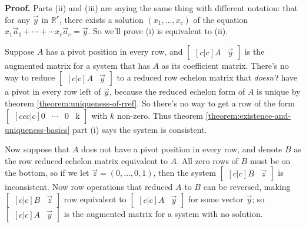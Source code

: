 \documentclass[11pt, letterpaper]{report}
\newenvironment{notes}{}{}
\newenvironment{book}{}{}
\newcounter{theorem}[chapter]
\newcommand{\R}{\mathbb{R}}
\begin{document}
\begin{notes}
\vfill
\newpage
\end{notes}

\begin{book}
\textbf{Proof.} Parts (ii) and (iii) are saying the same thing with different notation: that for any $\vec{y}$ in $\R^r$, there exists a solution $( x_1,\ldots,x_c )$ of the equation $x_1\vec{a}_1 + \cdots + \cdots x_c\vec{a}_c = \vec{y}$. So we'll prove (i) is equivalent to (ii).

Suppose $A$ has a pivot position in every row, and $\begin{bmatrix}[c|c]
A & \vec{y}
\end{bmatrix}$ is the augmented matrix for a system that has $A$ as its coefficient matrix. There's no way to reduce $\begin{bmatrix}[c|c]
A & \vec{y}
\end{bmatrix}$ to a reduced row echelon matrix that \emph{doesn't} have a pivot in every row left of $\vec{y}$, because the reduced echelon form of $A$ is unique by theorem \ref{theorem:uniqueness-of-rref}. So there's no way to get a row of the form $\begin{bmatrix}[ccc|c]
0 & \cdots & 0 & \text{k}
\end{bmatrix}$ with $k$ non-zero. Thus theorem \ref{theorem:existence-and-uniqueness-basics} part (i) says the system is consistent. 

Now suppose that $A$ does not have a pivot position in every row, and denote $B$ as the row reduced echelon matrix equivalent to $A$. All zero rows of $B$ must be on the bottom, so if we let $\vec{z}=(0, \ldots, 0, 1)$, then the system $\begin{bmatrix}[c|c]
B & \vec{z}
\end{bmatrix}$ is inconsistent. Now row operations that reduced $A$ to $B$ can be reversed, making $\begin{bmatrix}[c|c]
B & \vec{z}
\end{bmatrix}$ row equivalent to $\begin{bmatrix}[c|c]
A & \vec{y}
\end{bmatrix}$ for some vector $\vec{y}$; so $\begin{bmatrix}[c|c]
A & \vec{y}
\end{bmatrix}$ is the augmented matrix for a system with no solution.

\end{book}

\begin{notes}
\vfill 
\end{notes}
\end{document}
